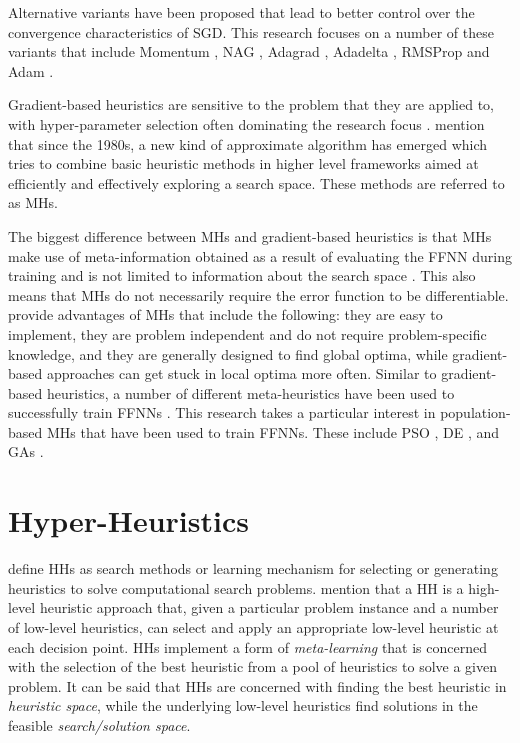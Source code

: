 \documentclass[preprint,review,12pt]{elsarticle}
\begin{document}
Alternative variants have been proposed that lead to better control over the convergence characteristics of \acs{SGD}. This research focuses on a number of these variants that include \acf{Momentum} \citep{ref:qian:1999}, \acf{NAG} \citep{ref:sutskever:2013}, \acf{Adagrad} \citep{ref:duchi:2011}, \acs{Adadelta} \citep{ref:zeiler:2012}, \acf{RMSProp} \citep{ref:hinton:2012} and \acf{Adam} \citep{ref:kingma:2014}.

Gradient-based heuristics are sensitive to the problem that they are applied to, with hyper-parameter selection often dominating the research focus \citep{ref:bengio:2000}. \citet{ref:blum:2003} mention that since the 1980s, a new kind of approximate algorithm has emerged which tries to combine basic heuristic methods in higher level frameworks aimed at efficiently and effectively exploring a search space. These methods are referred to as \acp{MH}.

The biggest difference between \acp{MH} and gradient-based heuristics is that \acp{MH} make use of meta-information obtained as a result of evaluating the \acs{FFNN} during training and is not limited to information about the search space \citep{ref:blum:2003}. This also means that \acp{MH} do not necessarily require the error function to be differentiable. \citet{ref:blum:2003} provide advantages of \acp{MH} that include the following: they are easy to implement, they are problem independent and do not require problem-specific knowledge, and they are generally designed to find global optima, while gradient-based approaches can get stuck in local optima more often. Similar to gradient-based heuristics, a number of different meta-heuristics have been used to successfully train \acp{FFNN} \citep{ref:rakitianskaia:2012, ref:vanwyk:2014}. This research takes a particular interest in population-based \acp{MH} that have been used to train \acp{FFNN}. These include \acf{PSO} \citep{ref:abdulkarim:2021}, \acf{DE} \citep{ref:xue:2022}, and \acfp{GA} \citep{ref:khan:2012}.


\section{Hyper-Heuristics}
\label{sec:hhs}

\citet{ref:burke:2010} define \acp{HH} as search methods or learning mechanism for selecting or generating heuristics to solve computational search problems. \citet{ref:burke:2003} mention that a \acs{HH} is a high-level heuristic approach that, given a particular problem instance and a number of low-level heuristics, can select and apply an appropriate low-level heuristic at each decision point. \acp{HH} implement a form of \textit{meta-learning} that is concerned with the selection of the best heuristic from a pool of heuristics to solve a given problem. It can be said that \acp{HH} are concerned with finding the best heuristic in \textit{heuristic space}, while the underlying low-level heuristics find solutions in the feasible \textit{search/solution space}.
\end{document}
